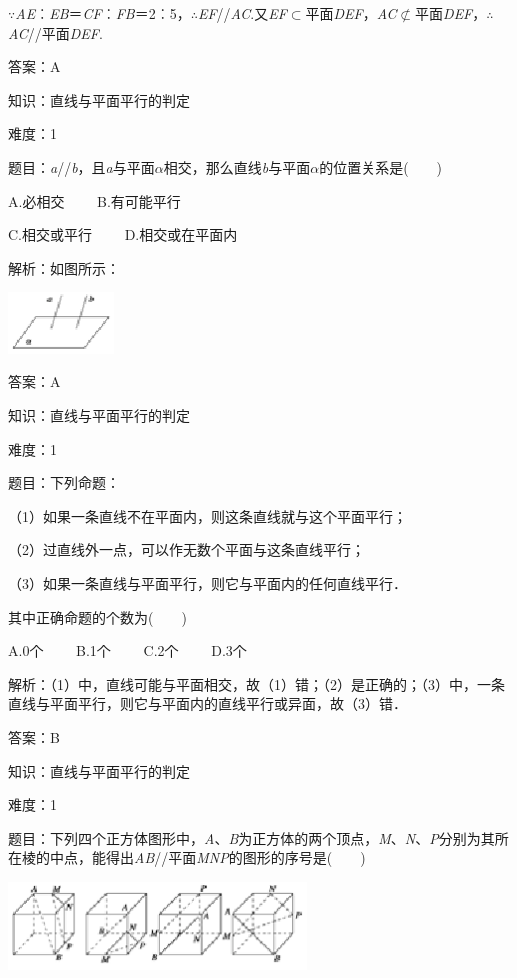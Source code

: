 \documentclass{article} %
\begin{document}
$\mathrm{\because}$\textit{AE}︰\textit{EB}＝\textit{CF}︰\textit{FB}＝2︰5，$\mathrm{\therefore}$\textit{EF}//\textit{AC}.又\textit{EF}$\mathrm{\subset }$平面\textit{DEF}，\textit{AC}$\mathrm{\nsubset}$平面\textit{DEF}，$\mathrm{\therefore}$\textit{AC}//平面\textit{DEF}.

答案：A

知识：直线与平面平行的判定

难度：1

题目：\textit{a}//\textit{b}，且\textit{a}与平面\textit{$\alpha$}相交，那么直线\textit{b}与平面\textit{$\alpha$}的位置关系是(　　)

A.必相交　　  B.有可能平行

C.相交或平行　　  D.相交或在平面内

解析：如图所示：

\includegraphics*[width=1.11in, height=0.64in, keepaspectratio=false]{image130}

答案：A

知识：直线与平面平行的判定

难度：1

题目：下列命题：

（1）如果一条直线不在平面内，则这条直线就与这个平面平行；

（2）过直线外一点，可以作无数个平面与这条直线平行；

（3）如果一条直线与平面平行，则它与平面内的任何直线平行．

其中正确命题的个数为(　　)

A.0个　　 B.1个　　 C.2个　　 D.3个

解析：（1）中，直线可能与平面相交，故（1）错；（2）是正确的；（3）中，一条直线与平面平行，则它与平面内的直线平行或异面，故（3）错．

答案：B

知识：直线与平面平行的判定

难度：1

题目：下列四个正方体图形中，\textit{A}、\textit{B}为正方体的两个顶点，\textit{M}、\textit{N}、\textit{P}分别为其所在棱的中点，能得出\textit{AB}//平面\textit{MNP}的图形的序号是(　　)

\includegraphics*[width=3.12in, height=0.92in, keepaspectratio=false]{image131}
\end{document}
